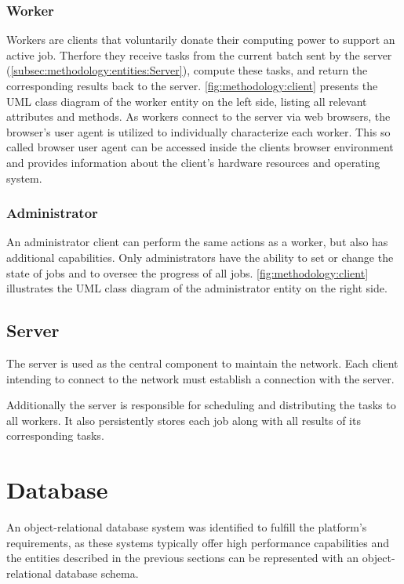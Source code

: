 \subsubsection{Worker}
\label{ssubsec:methodology:entities:client:worker}
Workers are clients that voluntarily donate their computing power to support an active job. Therfore they receive tasks from the current batch sent by the server (\autoref{subsec:methodology:entities:Server}), compute these tasks, and return the corresponding results back to the server. \autoref{fig:methodology:client} presents the \ac{UML} class diagram of the worker entity on the left side, listing all relevant attributes and methods. As workers connect to the server via web browsers, the browser's user agent is utilized to individually characterize each worker. This so called browser user agent can be accessed inside the clients browser environment and provides information about the client's hardware resources and operating system.

\subsubsection{Administrator}
\label{ssubsec:methodology:entities:client:admin}
An administrator client can perform the same actions as a worker, but also has additional capabilities. Only administrators have the ability to set or change the state of jobs and to oversee the progress of all jobs. \autoref{fig:methodology:client} illustrates the \ac{UML} class diagram of the administrator entity on the right side.

\subsection{Server}
\label{subsec:methodology:entities:Server}
The server is used as the central component to maintain the network. Each client intending to connect to the network must establish a connection with the server.

Additionally the server is responsible for scheduling and distributing the tasks to all workers. It also persistently stores each job along with all results of its corresponding tasks.

\section{Database}
An object-relational database system was identified to fulfill the platform's requirements, as these systems typically offer high performance capabilities and the entities described in the previous sections can be represented with an object-relational database schema.

